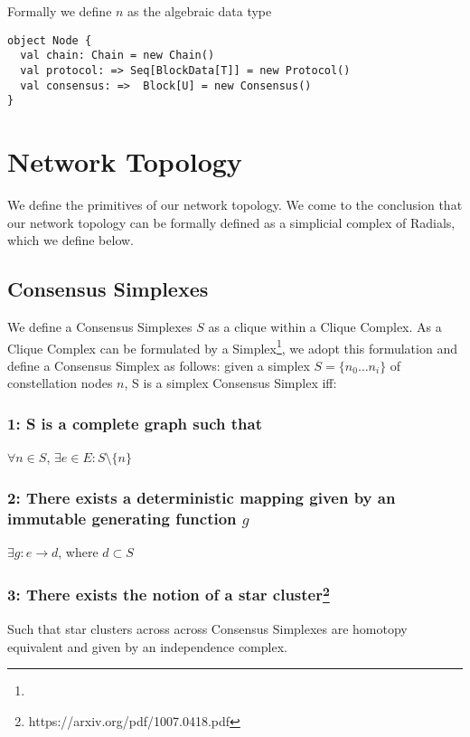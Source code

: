 \documentclass{article}
\begin{document}
Formally we define $n$ as the algebraic data type

\begin{lstlisting}
object Node {
  val chain: Chain = new Chain()
  val protocol: => Seq[BlockData[T]] = new Protocol()
  val consensus: =>  Block[U] = new Consensus()
}
\end{lstlisting}

\section{Network Topology}
We define the primitives of our network topology. We come to the conclusion that our network topology can be formally defined as a simplicial complex of Radials, which we define below.

\subsection{Consensus Simplexes}
We define a Consensus Simplexes $S$ as a clique within a Clique Complex. As a Clique Complex can be formulated by a Simplex\footnote{}, we adopt this formulation and define a Consensus Simplex as follows: given a simplex $S = \{n_0 \dots n_i\}$ of constellation nodes $n$, S is a simplex Consensus Simplex iff:

\subsubsection{1: S is a complete graph such that } 

\begin{center}
$\forall n \in S$, $\exists e \in E : S \setminus \{n\} $
\end{center}

\subsubsection{2: There exists a deterministic mapping given by an immutable generating function $g$}

\begin{center}
$\exists g: e \rightarrow d$, where $d \subset S$
\end{center}

\subsubsection{3: There exists the notion of a star cluster\footnote{https://arxiv.org/pdf/1007.0418.pdf}} Such that star clusters across across Consensus Simplexes are homotopy equivalent and given by an independence complex.
\end{document}
